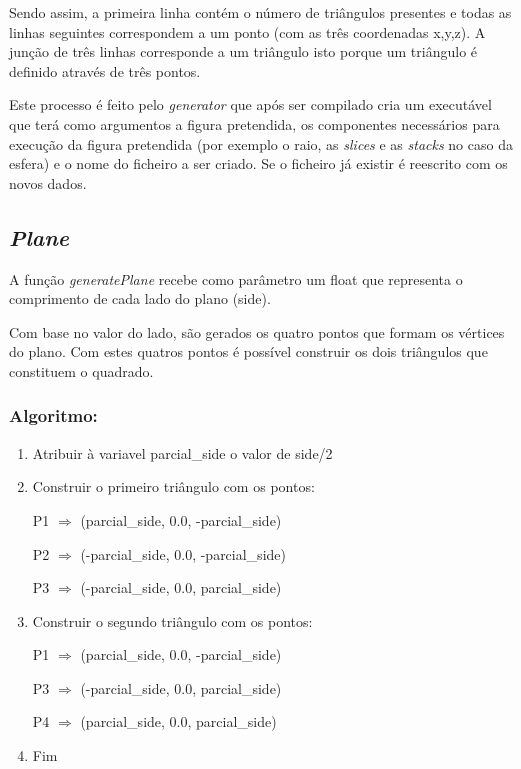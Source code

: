 \documentclass[a4paper]{article}
\begin{document}
Sendo assim, a primeira linha contém o número de triângulos presentes e todas as linhas seguintes correspondem a um ponto (com as três coordenadas x,y,z). A junção de três linhas corresponde a um triângulo isto porque um triângulo é definido através de três pontos.

Este processo é feito pelo \textit{generator} que após ser compilado cria um executável que terá como argumentos a figura pretendida, os componentes necessários para execução da figura pretendida (por exemplo o raio, as \textit{slices} e as \textit{stacks} no caso da esfera) e o nome do ficheiro a ser criado. Se o ficheiro já existir é reescrito com os novos dados.


\newpage

\subsection{\textit{Plane}}
\label{sec:plane}
A função \textit{generatePlane} recebe como parâmetro um float que representa o comprimento de cada lado do plano (side).

Com base no valor do lado, são gerados os quatro pontos que formam os vértices do plano. Com estes quatros pontos é possível construir os dois triângulos que constituem o quadrado.

\subsubsection{Algoritmo:}

\ttfamily
\begin{enumerate}
  \item Atribuir à variavel parcial\_side o valor de side/2
  \item Construir o primeiro triângulo com os pontos:

        \hspace{2cm} P1 $\Rightarrow$ (parcial\_side, 0.0, -parcial\_side)

        \hspace{2cm} P2 $\Rightarrow$ (-parcial\_side, 0.0, -parcial\_side)

        \hspace{2cm} P3 $\Rightarrow$ (-parcial\_side, 0.0, parcial\_side)
  \item Construir o segundo triângulo com os pontos:

        \hspace{2cm} P1 $\Rightarrow$ (parcial\_side, 0.0, -parcial\_side)

        \hspace{2cm} P3 $\Rightarrow$ (-parcial\_side, 0.0, parcial\_side)

        \hspace{2cm} P4 $\Rightarrow$ (parcial\_side, 0.0, parcial\_side)
  \item Fim
\end{enumerate}
\rmfamily
\end{document}
